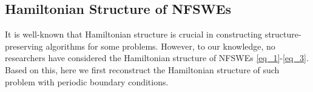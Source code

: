 \documentclass[preprint,compress,3p,10pt,fleqn]{elsarticle}
\numberwithin{equation}{section}
\begin{document}
\subsection{Hamiltonian Structure of NFSWEs}
It is well-known that Hamiltonian structure is crucial in constructing structure-preserving algorithms for some problems.
However, to our knowledge, no researchers have considered the Hamiltonian structure of NFSWEs \eqref{eq_1}-\eqref{eq_3}.
Based on this, here we first reconstruct the Hamiltonian structure of such problem with periodic boundary conditions.

\end{document}
